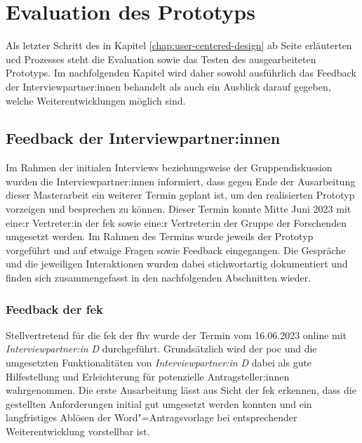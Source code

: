 \documentclass[a4paper,12pt,twoside,numbers=noendperiod]{scrreprt}
\begin{document}
\cleardoublepage
\chapter{Evaluation des Prototyps}
\label{chap:evaluation-prototyp}

Als letzter Schritt des in Kapitel \ref{chap:user-centered-design} ab Seite \pageref{chap:user-centered-design} erläuterten \acl{ucd} Prozesses steht die Evaluation sowie das Testen des ausgearbeiteten Prototyps. Im nachfolgenden Kapitel wird daher sowohl ausführlich das Feedback der Interviewpartner:innen behandelt als auch ein Ausblick darauf gegeben, welche Weiterentwicklungen möglich sind.

\section{Feedback der Interviewpartner:innen}
\label{sec:feedback-interviewpartner}

Im Rahmen der initialen Interviews beziehungsweise der Gruppendiskussion wurden die Interviewpartner:innen informiert, dass gegen Ende der Ausarbeitung dieser Masterarbeit ein weiterer Termin geplant ist, um den realisierten Prototyp vorzeigen und besprechen zu können. Dieser Termin konnte Mitte Juni 2023 mit eine:r Vertreter:in der \acl{fek} sowie eine:r Vertreter:in der Gruppe der Forschenden umgesetzt werden. Im Rahmen des Termins wurde jeweils der Prototyp vorgeführt und auf etwaige Fragen sowie Feedback eingegangen. Die Gespräche und die jeweiligen Interaktionen wurden dabei stichwortartig dokumentiert und finden sich zusammengefasst in den nachfolgenden Abschnitten wieder.

\subsection{Feedback der \acl{fek}}
\label{sub-sec:feedback-fek}

Stellvertretend für die \ac{fek} der \ac{fhv} wurde der Termin vom 16.06.2023 online mit \textit{Interviewpartner:in D} durchgeführt. Grundsätzlich wird der \ac{poc} und die umgesetzten Funktionalitäten von \textit{Interviewpartner:in D} dabei als gute Hilfestellung und Erleichterung für potenzielle Antragsteller:innen wahrgenommen. Die erste Ausarbeitung lässt aus Sicht der \acl{fek} erkennen, dass die gestellten Anforderungen initial gut umgesetzt werden konnten und ein langfristiges Ablösen der Word"=Antragsvorlage bei entsprechender Weiterentwicklung vorstellbar ist.
\end{document}
